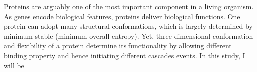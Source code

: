 Proteins are arguably one of the most important component in a living organism. As genes encode biological features, proteins deliver biological functions. One protein can adopt many structural conformations, which is largely determined by minimum stable (minimum overall entropy). Yet, three dimensional conformation and flexibility of a protein determine its functionality by allowing different binding property and hence initiating different cascades events. In this study, I will be 